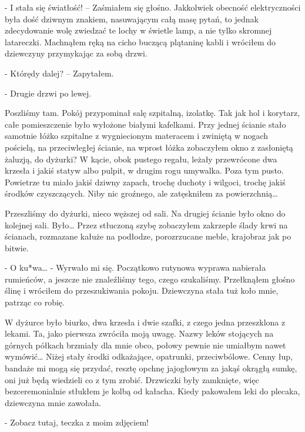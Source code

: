 \documentclass[../MAIN.tex]{subfiles}
\begin{document}
- I stała się światłość! – Zaśmiałem się głośno. Jakkolwiek obecność elektryczności była dość dziwnym znakiem, nasuwającym całą masę pytań, to jednak zdecydowanie wolę zwiedzać te lochy w świetle lamp, a nie tylko skromnej latareczki. Machnąłem ręką na cicho buczącą plątaninę kabli i wróciłem do dziewczyny przymykając za sobą drzwi.

- Którędy dalej? – Zapytałem.

- Drugie drzwi po lewej.

Poszliśmy tam. Pokój przypominał salę szpitalną, izolatkę. Tak jak hol i korytarz, całe pomieszczenie było wyłożone białymi kafelkami. Przy jednej ścianie stało samotnie łóżko szpitalne z wygniecionym materacem i zwiniętą w nogach pościelą, na przeciwległej ścianie, na wprost łóżka zobaczyłem okno z zasłoniętą żaluzją, do dyżurki? W kącie, obok pustego regału, leżały przewrócone dwa krzesła i jakiś statyw albo pulpit, w drugim rogu umywalka. Poza tym pusto. Powietrze tu miało jakiś dziwny zapach, trochę duchoty i wilgoci, trochę jakiś środków czyszczących. Niby nic groźnego, ale zatęskniłem za powierzchnią…

Przeszliśmy do dyżurki, nieco węższej od sali. Na drugiej ścianie było okno do kolejnej sali. Było… Przez stłuczoną szybę zobaczyłem zakrzepłe ślady krwi na ścianach, rozmazane kałuże na podłodze, porozrzucane meble, krajobraz jak po bitwie.

- O ku*wa… - Wyrwało mi się. Początkowo rutynowa wyprawa nabierała rumieńców, a jeszcze nie znaleźliśmy tego, czego szukaliśmy. Przełknąłem głośno ślinę i wróciłem do przeszukiwania pokoju. Dziewczyna stała tuż koło mnie, patrząc co robię.

W dyżurce było biurko, dwa krzesła i dwie szafki, z czego jedna przeszklona z lekami. Ta, jako pierwsza zwróciła moją uwagę. Nazwy leków stojących na górnych półkach brzmiały dla mnie obco, połowy pewnie nie umiałbym nawet wymówić… Niżej stały środki odkażające, opatrunki, przeciwbólowe. Cenny łup, bandaże mi mogą się przydać, resztę opchnę jajogłowym za jakąś okrągłą sumkę, oni już będą wiedzieli co z tym zrobić. Drzwiczki były zamknięte, więc bezceremonialnie stłukłem je kolbą od kałacha. Kiedy pakowałem leki do plecaka, dziewczyna mnie zawołała.

- Zobacz tutaj, teczka z moim zdjęciem!
\end{document}
